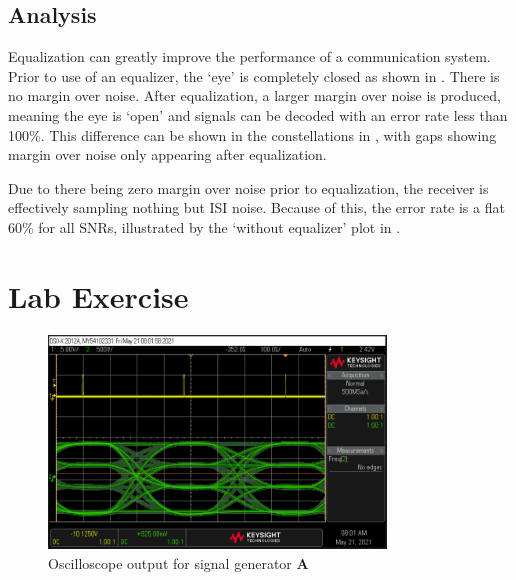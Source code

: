 \documentclass[11pt]{article}
\begin{document}
\subsection{Analysis}
Equalization can greatly improve the performance of a communication system.
Prior to use of an equalizer, the `eye' is completely closed as shown in
. There is no margin over noise. After equalization, a larger
margin over noise is produced, meaning the eye is `open' and signals can be
decoded with an error rate less than 100\%. This difference can be shown in the
constellations in , with gaps showing margin over noise only
appearing after equalization.

Due to there being zero margin over noise prior to equalization, the receiver is
effectively sampling nothing but ISI noise. Because of this, the error rate is a
flat 60\% for all SNRs, illustrated by the `without equalizer' plot in
.



\section{Lab Exercise}
\begin{figure}[H]
    \centering
    \includegraphics[width=0.8\textwidth]{scope.png}
    \caption{Oscilloscope output for signal generator \textbf{A}\label{scope}}
\end{figure}
\end{document}
